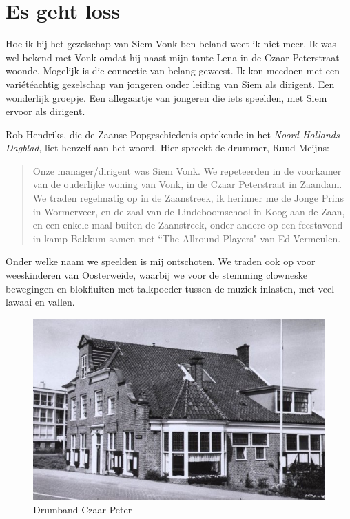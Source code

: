 \documentclass[12pt,twoside, openright]{memoir}
\begin{document}
\chapter{Es geht loss} %
\label{cha:gehtloss}

Hoe ik bij het gezelschap van Siem Vonk ben beland weet ik niet meer. Ik was wel bekend met Vonk omdat hij naast mijn tante Lena in de Czaar Peterstraat woonde. Mogelijk is die connectie van belang geweest. Ik kon meedoen met een variétéachtig gezelschap van jongeren onder leiding van Siem als dirigent. Een wonderlijk groepje. Een allegaartje van jongeren die iets speelden, met Siem ervoor als dirigent.

Rob Hendriks, die de Zaanse Popgeschiedenis optekende in het \emph{Noord Hollands Dagblad}, liet henzelf aan het woord. Hier spreekt de drummer, Ruud Meijns: 

\begin{quote}
Onze manager/dirigent was Siem Vonk. We repeteerden in de voorkamer van de ouderlijke woning van Vonk, in de Czaar Peterstraat in Zaandam. We traden regelmatig op in de Zaanstreek, ik herinner me de Jonge Prins in Wormerveer, en de zaal van de Lindeboomschool in Koog aan de Zaan, en een enkele maal buiten de Zaanstreek, onder andere op een feestavond in kamp Bakkum samen met ``The Allround Players" van Ed Vermeulen.
\end{quote}

Onder welke naam we speelden is mij ontschoten. We traden ook op voor weeskinderen van Oosterweide, waarbij we voor de stemming clowneske bewegingen en blokfluiten met talkpoeder tussen de muziek inlasten, met veel lawaai en vallen. 

\begin{figure}
\includegraphics[width=\textwidth]{img/ch24/Oosterweide}
\caption*{\footnotesize Drumband Czaar Peter}
\end{figure}
\end{document}
